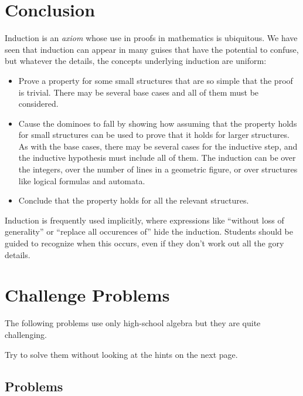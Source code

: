 \documentclass[11pt,a4paper]{report}
\begin{document}

\chapter{Conclusion}\label{s.conclusion}

Induction is an \emph{axiom} whose use in proofs in mathematics is ubiquitous. We have seen that induction can appear in many guises that have the potential to confuse, but whatever the details, the concepts underlying induction are uniform:
\begin{itemize}
\item Prove a property for some small structures that are so simple that the proof is trivial. There may be several base cases and all of them must be considered.
\item Cause the dominoes to fall by showing how assuming that the property holds for small structures can be used to prove that it holds for larger structures. As with the base cases, there may be several cases for the inductive step, and the inductive hypothesis must include all of them. The induction can be over the integers, over the number of lines in a geometric figure, or over structures like logical formulas and automata. 
\item Conclude that the property holds for all the relevant structures.
\end{itemize}

Induction is frequently used implicitly, where expressions like ``without loss of generality'' or ``replace all occurences of'' hide the induction. Students should be guided to recognize when this occurs, even if they don't work out all the gory details.


\appendix

\chapter{Challenge Problems}\label{a.challenge}

The following problems use only high-school algebra but they are quite challenging.

Try to solve them without looking at the hints on the next page.

\section{Problems}
\end{document}
